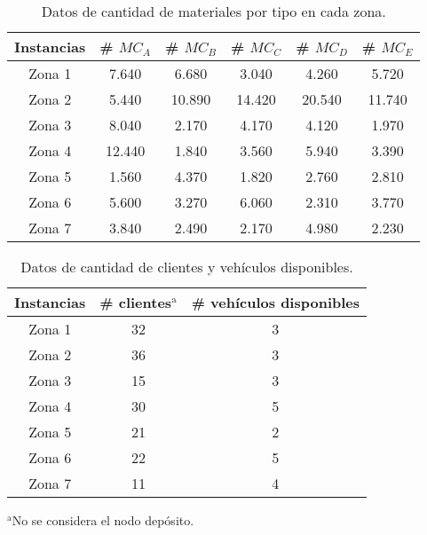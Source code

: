 \documentclass[conference]{IEEEtran}
\begin{document}
\begin{table}[H]

\caption{Datos de cantidad de materiales por tipo en cada zona.}
\begin{center}
\begin{tabular}{|c|c|c|c|c|c|}
\hline
\textbf{Instancias}& \# $MC_A$ & \# $MC_B$ & \# $MC_C$ & \# $MC_D$ & \# $MC_E$\\
 
\hline
Zona 1& 7.640 & 6.680 & 3.040 & 4.260 & 5.720\\
\hline
Zona 2& 5.440 & 10.890 & 14.420 & 20.540 & 11.740\\
\hline
Zona 3& 8.040 & 2.170 & 4.170 & 4.120 & 1.970\\
\hline
Zona 4& 12.440 & 1.840 & 3.560 & 5.940 & 3.390\\
\hline
Zona 5& 1.560 & 4.370 & 1.820 & 2.760 & 2.810\\
\hline
Zona 6& 5.600 & 3.270 & 6.060 & 2.310 & 3.770 \\
\hline
Zona 7& 3.840 & 2.490 & 2.170 & 4.980 & 2.230\\
\hline
\end{tabular}
\label{tab1}
\end{center}
\end{table}


\begin{table}[H]

\caption{Datos de cantidad de clientes y veh\'iculos disponibles.}
\begin{center}
\begin{tabular}{|c|c|c|}
\hline
\textbf{Instancias}& \# clientes$^{\mathrm{a}}$ & \# veh\'iculos disponibles  \\
 
\hline
Zona 1& 32 & 3 \\
\hline
Zona 2& 36 & 3 \\
\hline
Zona 3& 15 & 3 \\
\hline
Zona 4& 30 & 5 \\
\hline
Zona 5& 21 & 2 \\
\hline
Zona 6& 22 & 5 \\
\hline
Zona 7& 11& 4 \\
\hline
\end{tabular}
\label{tab1}
\end{center}
{$^{\mathrm{a}}$No se considera el nodo dep\'osito.}
\end{table}
\end{document}
